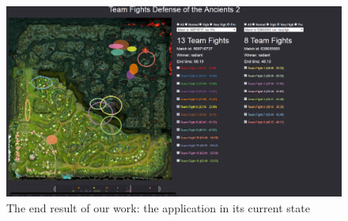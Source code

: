 \documentclass[11pt,twoside,a4paper]{article}
\begin{document}
\begin{figure}
\centering
  \includegraphics[width=\textwidth]{endResult.png}
\caption{The end result of our work: the application in its current state}
\label{fig:endresult}
\end{figure}
\end{document}
